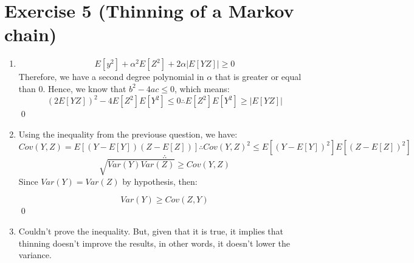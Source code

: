 \documentclass[12pt,letterpaper]{article}
\begin{document}
\section*{Exercise 5 (Thinning of a Markov chain)}
\begin{enumerate}[leftmargin=!,labelindent=5pt]
\item
$$
E[y^2] + \alpha^2E[Z^2] + 2\alpha |E[YZ]| \geq 0
$$
Therefore, we have a second degree polynomial in $\alpha$ that is
greater or equal than 0. Hence, we know that $b^2 - 4ac \leq 0$, which
means:
$$
(2 E[YZ])^2 - 4E[Z^2]E[Y^2] \leq 0 \therefore
E[Z^2]E[Y^2] \geq |E[YZ]|
$$
\qed

\item Using the inequality from the previouse question, we have:
$$
Cov(Y,Z) = E[(Y-E[Y])(Z - E[Z])] \therefore
Cov(Y,Z)^2 \leq E[(Y-E[Y])^2]E[(Z - E[Z])^2]
$$
$$
\therefore
$$
$$
\sqrt{Var(Y)Var(Z)} \geq Cov(Y,Z)
$$
Since $Var(Y) = Var(Z)$ by hypothesis, then:

$$
Var(Y) \geq Cov(Z,Y)
$$
\qed

\item Couldn't prove the inequality. But, given that it is true,
it implies that thinning doesn't improve the results, in other words,
it doesn't lower the variance.
\end{enumerate}

\newpage
\end{document}
